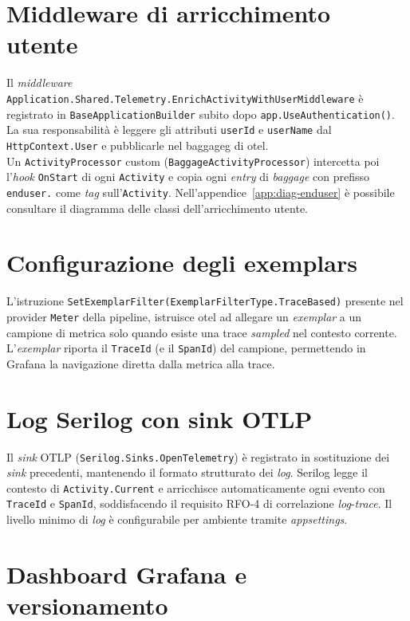 \section{Middleware di arricchimento utente}

Il \emph{middleware} \texttt{Application.Shared.Telemetry.EnrichActivityWithUserMiddleware} è
registrato in \texttt{BaseApplicationBuilder} subito dopo
\texttt{app.UseAuthentication()}. La sua responsabilità è leggere gli attributi
\texttt{userId} e \texttt{userName} dal \texttt{HttpContext.User} e pubblicarle nel
\gls{baggageg} di \gls{otel}.\\ Un \texttt{ActivityProcessor} custom
(\texttt{BaggageActivityProcessor}) intercetta poi l'\emph{hook} \texttt{OnStart} di ogni
\texttt{Activity} e copia ogni \emph{entry} di \emph{baggage} con prefisso \texttt{enduser.}
come \emph{tag} sull'\texttt{Activity}. Nell'appendice~\ref{app:diag-enduser} è possibile consultare
il diagramma delle classi dell'arricchimento utente.

\section{Configurazione degli exemplars}

L'istruzione \texttt{SetExemplarFilter(ExemplarFilterType.TraceBased)} presente nel provider
\texttt{Meter} della pipeline, istruisce
\gls{otel} ad allegare un \emph{exemplar} a un campione di metrica solo quando esiste una
trace \emph{sampled} nel contesto corrente. L'\emph{exemplar} riporta il \texttt{TraceId}
(e il \texttt{SpanId}) del campione, permettendo in Grafana la navigazione diretta dalla
metrica alla trace.

\section{Log Serilog con sink OTLP}

Il \emph{sink} OTLP (\texttt{Serilog.Sinks.OpenTelemetry})
è registrato in sostituzione dei \emph{sink} precedenti,
mantenendo il formato strutturato dei \emph{log}. Serilog legge il contesto di
\texttt{Activity.Current} e arricchisce automaticamente ogni evento con \texttt{TraceId} e
\texttt{SpanId}, soddisfacendo il requisito RFO-4 di correlazione \emph{log}-\emph{trace}.
Il livello minimo di \emph{log} è configurabile per ambiente tramite \emph{appsettings}.

\section{Dashboard Grafana e versionamento}

